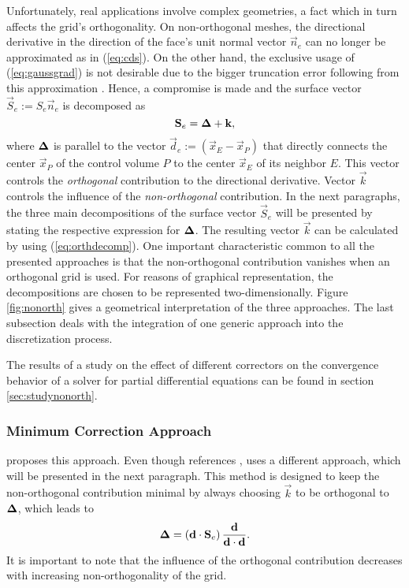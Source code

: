 Unfortunately, real applications involve complex geometries, a fact which in turn affects the grid's orthogonality. On non-orthogonal meshes, the directional derivative in the direction of the face's unit normal vector \(\vec{n}_e\) can no longer be approximated as in (\ref{eq:cds}). On the other hand, the exclusive usage of (\ref{eq:gaussgrad}) is not desirable due to the bigger truncation error following from this approximation \cite{jasak96}. Hence, a compromise is made and the surface vector \(\vec{S}_e := S_e \vec{n}_e\) is decomposed as
\begin{equation}
  \label{eq:orthdecomp}
  \mathbf{S}_e = \boldsymbol{\Delta} + \mathbf{k},
\end{equation}
where \(\boldsymbol{\Delta}\) is parallel to the vector \(\vec{d}_e := \left(\vec{x}_E - \vec{x}_P\right)\) that directly connects the center \(\vec{x}_P\) of the control volume \(P\) to the center \(\vec{x}_E\) of its neighbor \(E\). This vector controls the \emph{orthogonal} contribution to the directional derivative. Vector \(\vec{k}\) controls the influence of the \emph{non-orthogonal} contribution. In the next paragraphs, the three main decompositions of the surface vector \(\vec{S}_e\) will be presented by stating the respective expression for \(\boldsymbol{\Delta}\). The resulting vector \(\vec{k}\) can be calculated by using (\ref{eq:orthdecomp}). One important characteristic common to all the presented approaches is that the non-orthogonal contribution vanishes when an orthogonal grid is used. For reasons of graphical representation, the decompositions are chosen to be represented two-dimensionally. Figure \ref{fig:nonorth} gives a geometrical interpretation of the three approaches. The last subsection deals with the integration of one generic approach into the discretization process. 

The results of a study on the effect of different correctors on the convergence behavior of a solver for partial differential equations can be found in section \ref{sec:studynonorth}.

\subsubsection{Minimum Correction Approach}

\cite{muzaferja} proposes this approach. Even though \cite{ferziger02} references \cite{muzaferja}, \cite{ferziger02} uses a different approach, which will be presented in the next paragraph. This method is designed to keep the non-orthogonal contribution minimal by always choosing \(\vec{k}\) to be orthogonal to \(\boldsymbol{\Delta}\), which leads to
\begin{displaymath}
  \boldsymbol{\Delta} = \left( \mathbf{d} \cdot \mathbf{S}_e \right) \frac{\mathbf{d}}{\mathbf{d} \cdot \mathbf{d}}.
\end{displaymath}
It is important to note that the influence of the orthogonal contribution decreases with increasing non-orthogonality of the grid.

